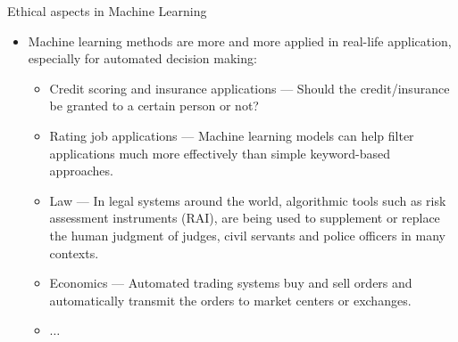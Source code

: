 \documentclass[11pt,compress,t,notes=noshow, xcolor=table]{beamer}
\begin{document}



\sloppy

\begin{vbframe}{Ethical aspects in Machine Learning}
%
  \begin{itemize}
%  	
    \item Machine learning methods are more and more applied in real-life application, especially for automated decision making:
%
    \begin{itemize}
%    	
		\item Credit scoring and insurance applications --- Should the credit/insurance be granted to a certain person or not?
%		
		\item Rating job applications --- Machine learning models can help filter applications much more effectively than simple keyword-based approaches.
%		
		\item Law ---  In legal systems around the world, algorithmic tools such as risk assessment instruments (RAI), are being used to supplement or replace the human judgment of judges, civil servants and police officers in many contexts. 
%		
		\item Economics --- Automated trading systems buy and sell orders and automatically transmit the orders to market centers or exchanges. 
%		
		\item $\ldots$
%    	
    \end{itemize}
%
  \end{itemize}
%
\end{vbframe}
\end{document}

